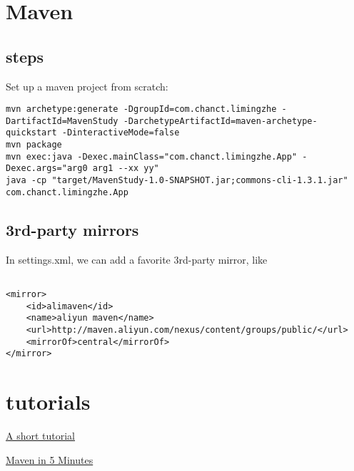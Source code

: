 \section{Maven}

\subsection{steps}
Set up a maven project from scratch:
\begin{verbatim}
mvn archetype:generate -DgroupId=com.chanct.limingzhe -DartifactId=MavenStudy -DarchetypeArtifactId=maven-archetype-quickstart -DinteractiveMode=false
mvn package
mvn exec:java -Dexec.mainClass="com.chanct.limingzhe.App" -Dexec.args="arg0 arg1 --xx yy"
java -cp "target/MavenStudy-1.0-SNAPSHOT.jar;commons-cli-1.3.1.jar" com.chanct.limingzhe.App
\end{verbatim}

\subsection{3rd-party mirrors}

In settings.xml, we can add a favorite 3rd-party mirror, like

\begin{verbatim}
    
<mirror>
    <id>alimaven</id>
    <name>aliyun maven</name>
    <url>http://maven.aliyun.com/nexus/content/groups/public/</url>
    <mirrorOf>central</mirrorOf>        
</mirror>
\end{verbatim}


\section{tutorials}

\href{http://huangnx.com/tags/maven/}{A short tutorial}

\href{https://maven.apache.org/guides/getting-started/maven-in-five-minutes.html}{Maven
in 5 Minutes}


